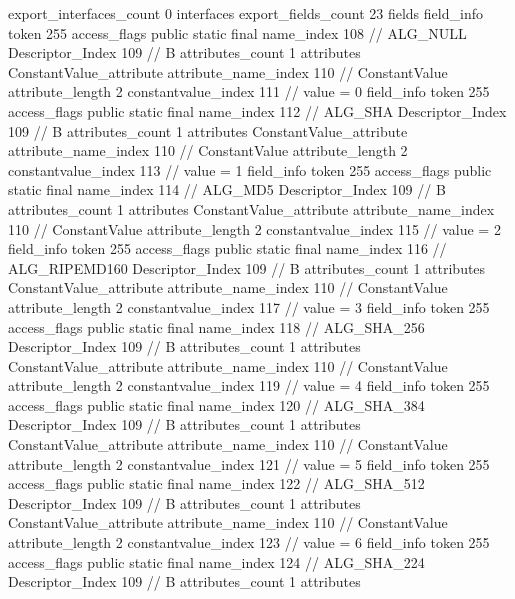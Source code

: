 {{{{			}
			export_interfaces_count	0
			interfaces {
			}
			export_fields_count	23
			fields {
			field_info {
				token	255
				access_flags	public static final
				name_index	108		// ALG_NULL
				Descriptor_Index	109		// B
				attributes_count	1
				attributes {
				ConstantValue_attribute {
					attribute_name_index	110		// ConstantValue
					attribute_length	2
					constantvalue_index	111		// value = 0
				}
				}
			}
			field_info {
				token	255
				access_flags	public static final
				name_index	112		// ALG_SHA
				Descriptor_Index	109		// B
				attributes_count	1
				attributes {
				ConstantValue_attribute {
					attribute_name_index	110		// ConstantValue
					attribute_length	2
					constantvalue_index	113		// value = 1
				}
				}
			}
			field_info {
				token	255
				access_flags	public static final
				name_index	114		// ALG_MD5
				Descriptor_Index	109		// B
				attributes_count	1
				attributes {
				ConstantValue_attribute {
					attribute_name_index	110		// ConstantValue
					attribute_length	2
					constantvalue_index	115		// value = 2
				}
				}
			}
			field_info {
				token	255
				access_flags	public static final
				name_index	116		// ALG_RIPEMD160
				Descriptor_Index	109		// B
				attributes_count	1
				attributes {
				ConstantValue_attribute {
					attribute_name_index	110		// ConstantValue
					attribute_length	2
					constantvalue_index	117		// value = 3
				}
				}
			}
			field_info {
				token	255
				access_flags	public static final
				name_index	118		// ALG_SHA_256
				Descriptor_Index	109		// B
				attributes_count	1
				attributes {
				ConstantValue_attribute {
					attribute_name_index	110		// ConstantValue
					attribute_length	2
					constantvalue_index	119		// value = 4
				}
				}
			}
			field_info {
				token	255
				access_flags	public static final
				name_index	120		// ALG_SHA_384
				Descriptor_Index	109		// B
				attributes_count	1
				attributes {
				ConstantValue_attribute {
					attribute_name_index	110		// ConstantValue
					attribute_length	2
					constantvalue_index	121		// value = 5
				}
				}
			}
			field_info {
				token	255
				access_flags	public static final
				name_index	122		// ALG_SHA_512
				Descriptor_Index	109		// B
				attributes_count	1
				attributes {
				ConstantValue_attribute {
					attribute_name_index	110		// ConstantValue
					attribute_length	2
					constantvalue_index	123		// value = 6
				}
				}
			}
			field_info {
				token	255
				access_flags	public static final
				name_index	124		// ALG_SHA_224
				Descriptor_Index	109		// B
				attributes_count	1
				attributes {
}}}}}}
